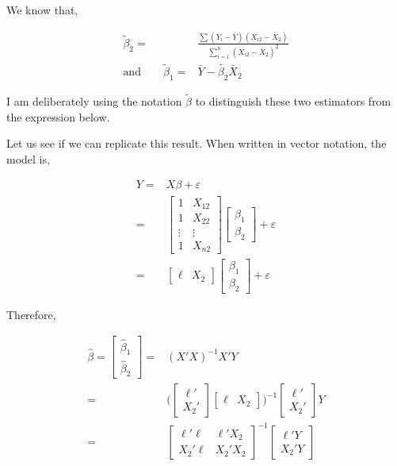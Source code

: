 \documentclass[
  letterpaper,
  DIV=11,
  numbers=noendperiod]{scrreprt}
\begin{document}
We know that,

\[
\begin{align}
\tilde{\beta}_2 =& \frac{\sum(Y_i-\bar{Y})(X_{i2}-\bar{X}_2)}{\sum_{i=1}^n(X_{i2}-\bar{X}_2)^2} \\
\text{and}\qquad \tilde{\beta}_1 =& \bar{Y}-\tilde{\beta_2}\bar{X}_2
\end{align}
\]

I am deliberately using the notation \(\tilde{\beta}\) to distinguish
these two estimators from the expression below.

Let us see if we can replicate this result. When written in vector
notation, the model is,

\[
\begin{align}
Y =& X\beta+\varepsilon \\
=& \begin{bmatrix}1&X_{12} \\ 1 & X_{22} \\ \vdots & \vdots \\ 1 & X_{n2}\end{bmatrix}\begin{bmatrix}\beta_1 \\ \beta_2 \end{bmatrix} + \varepsilon \\
=& \begin{bmatrix}\ell &X_{2} \end{bmatrix}\begin{bmatrix}\beta_1 \\ \beta_2 \end{bmatrix} + \varepsilon
\end{align}
\]

Therefore,

\[
\begin{align} 
\hat{\beta} = \begin{bmatrix}\hat{\beta}_1 \\ \hat{\beta}_2\end{bmatrix}=&(X'X)^{-1}X'Y \\
=&\bigg(\begin{bmatrix}\ell' \\ X_{2}' \end{bmatrix}\begin{bmatrix}\ell &X_{2}\end{bmatrix}\bigg)^{-1}\begin{bmatrix}\ell'  \\ X_{2}' \end{bmatrix}Y \\
=&\begin{bmatrix}\ell'\ell & \ell'X_2 \\ X_{2}'\ell & X_2'X_2 \end{bmatrix}^{-1}\begin{bmatrix}\ell'Y  \\ X_{2}'Y \end{bmatrix}
\end{align} 
\]
\end{document}
